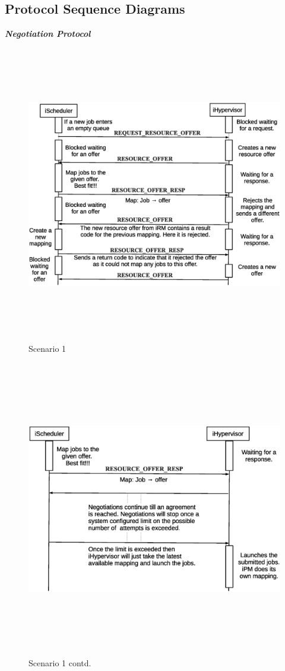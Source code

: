 \documentclass[a4paper, 12pt]{article}
\begin{document}
\subsection{Protocol Sequence Diagrams}
\vspace{10mm}
\large\textbf{\textit{Negotiation Protocol}}
\begin{figure}[h]
\centering
\includegraphics[width=1.0\textwidth, height=130mm]{./figures.eps}
\caption{Scenario 1}
\label{fig:Seq1}
\end{figure}
\clearpage
\begin{figure}[h]
\centering
\includegraphics[width=1.0\textwidth, height=130mm]{./figures1.eps}
\caption{Scenario 1 contd.}
\label{fig:Seq1}
\end{figure}
\end{document}
